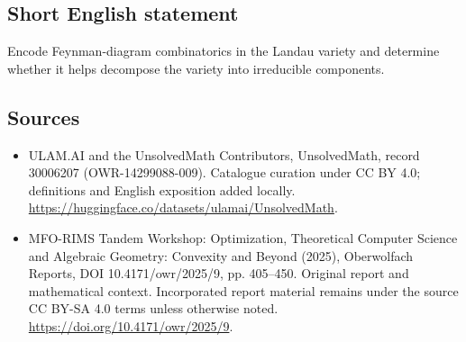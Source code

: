 \documentclass[11pt]{article}
\begin{document}
\subsection{Short English statement}
Encode Feynman-diagram combinatorics in the Landau variety and determine whether it helps decompose the variety into irreducible components.
\subsection{Sources}
\begin{itemize}
\item[\hypertarget{source:30006207:1}{S1}] ULAM.AI and the UnsolvedMath Contributors, UnsolvedMath, record 30006207 (OWR-14299088-009). Catalogue curation under CC BY 4.0; definitions and English exposition added locally.
\url{https://huggingface.co/datasets/ulamai/UnsolvedMath}.
\item[\hypertarget{source:30006207:2}{S2}] MFO-RIMS Tandem Workshop: Optimization, Theoretical Computer Science and Algebraic Geometry: Convexity and Beyond (2025), Oberwolfach Reports, DOI 10.4171/owr/2025/9, pp. 405--450. Original report and mathematical context. Incorporated report material remains under the source CC BY-SA 4.0 terms unless otherwise noted.
\url{https://doi.org/10.4171/owr/2025/9}.
\end{itemize}
\label{end:30006207}
\end{document}
